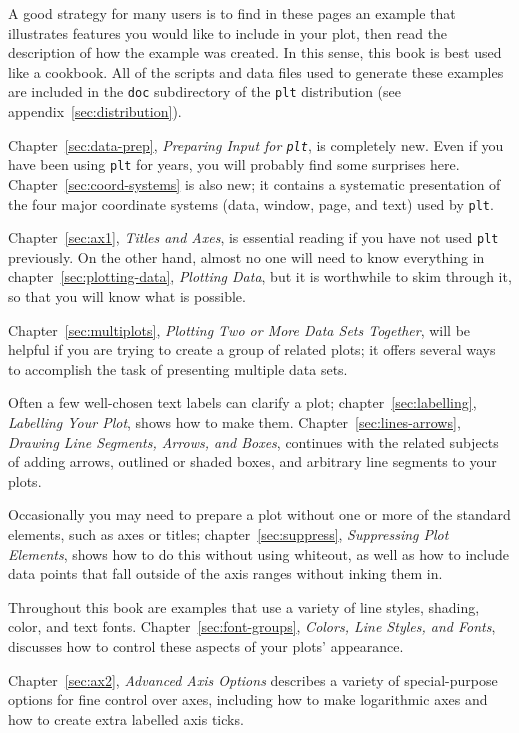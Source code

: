 \documentclass{book}
\begin{document}
A good strategy for many users is to find in these pages an example
that illustrates features you would like to include in your plot, then
read the description of how the example was created.  In this sense,
this book is best used like a cookbook.  All of the scripts and data
files used to generate these examples are included in the {\tt doc}
subdirectory of the {\tt plt} distribution (see
appendix~\ref{sec:distribution}).

Chapter~\ref{sec:data-prep}, {\em Preparing Input for {\tt plt}}, is completely
new.  Even if you have been using {\tt plt} for years, you will probably find
some surprises here.  Chapter~\ref{sec:coord-systems} is also new; it contains
a systematic presentation of the four major coordinate systems (data, window,
page, and text) used by {\tt plt}.

Chapter~\ref{sec:ax1}, {\em Titles and Axes}, is essential reading if you have
not used {\tt plt} previously.  On the other hand, almost no one will need to
know everything in chapter~\ref{sec:plotting-data}, {\em Plotting Data}, but
it is worthwhile to skim through it, so that you will know what is possible.

Chapter~\ref{sec:multiplots}, {\em Plotting Two or More Data Sets Together},
will be helpful if you are trying to create a group of related plots; it
offers several ways to accomplish the task of presenting multiple data sets.

Often a few well-chosen text labels can clarify a plot;
chapter~\ref{sec:labelling}, {\em Labelling Your Plot}, shows how to make them.
Chapter~\ref{sec:lines-arrows}, {\em Drawing Line Segments, Arrows, and Boxes},
continues with the related subjects of adding arrows, outlined or shaded boxes,
and arbitrary line segments to your plots.

Occasionally you may need to prepare a plot without one or more of the standard
elements, such as axes or titles; chapter~\ref{sec:suppress}, {\em Suppressing
Plot Elements}, shows how to do this without using whiteout, as well as how to
include data points that fall outside of the axis ranges without inking them
in.

Throughout this book are examples that use a variety of line styles, shading,
color, and text fonts.  Chapter~\ref{sec:font-groups}, {\em Colors, Line
Styles, and Fonts}, discusses how to control these aspects of your plots'
appearance.

Chapter~\ref{sec:ax2}, {\em Advanced Axis Options} describes a variety of
special-purpose options for fine control over axes, including how to make
logarithmic axes and how to create extra labelled axis ticks.
\end{document}
